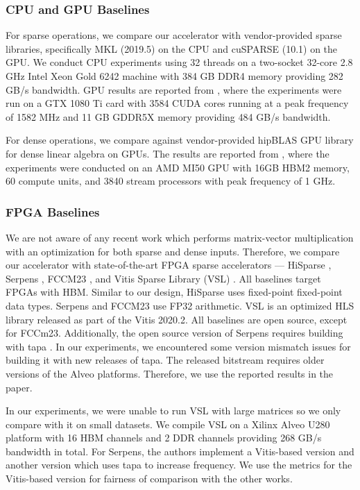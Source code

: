\documentclass[manuscript,screen,review]{acmart}
\begin{document}
\subsubsection{CPU and GPU Baselines}

For sparse operations, we compare our accelerator with vendor-provided sparse libraries, specifically MKL (2019.5) on the CPU and cuSPARSE (10.1) on the GPU. We conduct CPU experiments using 32 threads on a two-socket 32-core 2.8 GHz Intel Xeon Gold 6242 machine with 384 GB DDR4 memory providing 282 GB/s bandwidth. GPU results are reported from \cite{hisparse}, where the experiments were run on a GTX 1080 Ti card with 3584 CUDA cores running at a peak frequency of 1582 MHz and 11 GB GDDR5X memory providing 484 GB/s bandwidth.

For dense operations, we compare against vendor-provided hipBLAS GPU library for dense linear algebra on GPUs. The results are reported from \cite{gpu-dense}, where the experiments were conducted on an AMD MI50 GPU with 16GB HBM2 memory, 60 compute units, and 3840 stream processors with peak frequency of 1 GHz.


\subsubsection{FPGA Baselines}

We are not aware of any recent work which performs matrix-vector multiplication with an optimization for both sparse and dense inputs. Therefore, we compare our accelerator with state-of-the-art FPGA sparse accelerators — HiSparse \cite{hisparse}, Serpens \cite{serpens}, FCCM23 \cite{fccm-spmv}, and Vitis Sparse Library (VSL) \cite{Xilinx2021}. All baselines target FPGAs with HBM. Similar to our design, HiSparse uses fixed-point fixed-point data types. Serpens and FCCM23 use FP32 arithmetic. VSL is an optimized HLS library released as part of the Vitis 2020.2. All baselines are open source, except for FCCm23. Additionally, the open source version of Serpens requires building with tapa \cite{tapa}. In our experiments, we encountered some version mismatch issues for building it with new releases of tapa. The released bitstream 
requires older versions of the Alveo platforms. Therefore, we use the reported results in the paper.


In our experiments, we were unable to run VSL with large matrices so we only compare with it on small datasets. We compile VSL on a Xilinx Alveo U280 platform with
16 HBM channels and 2 DDR channels providing 268 GB/s bandwidth in total. For Serpens, the authors implement a Vitis-based version and another version which uses tapa \cite{tapa} to increase frequency. We use the metrics for the Vitis-based version for fairness of comparison with the other works. 
\end{document}
